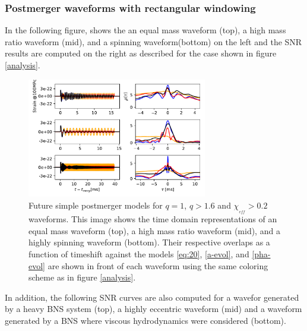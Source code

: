 \subsubsection*{Postmerger waveforms with rectangular windowing}


In the following figure, shows the an equal mass waveform (top), a high mass ratio waveform (mid), and a spinning waveform(bottom) on the left and the SNR results are computed on the right as described for the case shown in figure \ref{analysis}.


\begin{figure}[hbt!]
\begin{center}
\includegraphics[width=0.7\textwidth, angle=0]{images/Data_analysis/results/phi-A1.pdf}
\captionsetup{width=0.8\textwidth}
\caption[Future simple postmerger models for $q=1$, $q>1.6$ and $\chi_{_{eff}}>0.2$ waveforms]{Future simple postmerger models for $q=1$, $q>1.6$ and $\chi_{_{eff}}>0.2$ waveforms. This image shows the time domain representations of an equal mass waveform (top), a high mass ratio waveform (mid), and a highly spinning waveform (bottom). Their respective overlaps as a function of timeshift against the models \ref{eq:20}, \ref{a-evol}, and \ref{pha-evol} are shown in front of each waveform using the same coloring scheme as in figure \ref{analysis}.}
\label{ncfrnv}
\end{center}
\end{figure}
\FloatBarrier

In addition, the following SNR curves are also computed for a wavefor generated by a heavy BNS system (top), a highly eccentric waveform (mid) and a waveform generated by a BNS where viscous hydrodynamics were considered (bottom).

